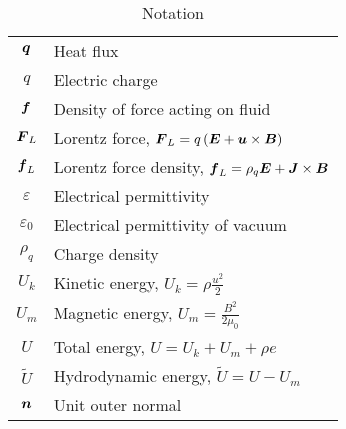 \begin{table}
\begin{tabular}{ |c|l| }
        $\mbox{\boldmath $q$}$ & Heat flux\\
        $q$ & Electric charge\\
        $\mbox{\boldmath $f$}$ & Density of force acting on fluid\\
        $\mbox{\boldmath $F$}_L$ & Lorentz force, $\mbox{\boldmath $F$}_L = q\left(\mbox{\boldmath $E$} + \mbox{\boldmath $u$}\times\mbox{\boldmath $B$}\right)$\\
        $\mbox{\boldmath $f$}_L$ & Lorentz force density, $\mbox{\boldmath $f$}_L = \rho_q\mbox{\boldmath $E$} + \mbox{\boldmath $J$}\times\mbox{\boldmath $B$}$\\
        $\varepsilon$ & Electrical permittivity\\
        $\varepsilon_0$ & Electrical permittivity of vacuum\\
        $\rho_q$ & Charge density\\
        $U_k$ & Kinetic energy, $U_k = \rho\frac{u^2}{2}$ \\ 
        $U_m$ & Magnetic energy, $U_m = \frac{B^2}{2{}\mu_0}$ \\ 
        $U$ & Total energy, $U = U_k + U_m + \rho e$ \\ 
        $\tilde{U}$ & Hydrodynamic energy, $\tilde{U} = U - U_m$ \\ 
        $\mbox{\boldmath $n$}$ & Unit outer normal \\ 
        \hline
    \end{tabular}
    \caption{Notation}
    \label{table:notation}
\end{table}

